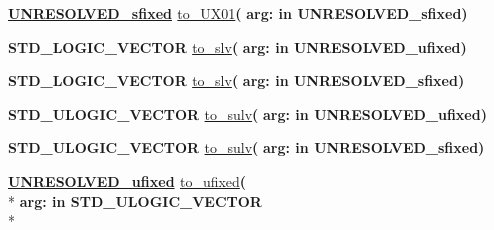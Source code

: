 \begin{DoxyCompactItemize}
\item 
{\bfseries {\bfseries {\bfseries \hyperlink{classfixed__pkg_aa723b28a027c3c0f9bca02d75e8df4d6}{U\+N\+R\+E\+S\+O\+L\+V\+E\+D\+\_\+sfixed}} \textcolor{vhdlchar}{ }}} \hyperlink{classfixed__pkg_a334f0e406ea4f02f81890e38376e20a1}{to\+\_\+\+U\+X01}{\bfseries  ( }{\bfseries \textcolor{vhdlchar}{arg\+: }\textcolor{stringliteral}{in }\textcolor{vhdlchar}{U\+N\+R\+E\+S\+O\+L\+V\+E\+D\+\_\+sfixed}}{\bfseries  )} 
\item 
{\bfseries {\bfseries \textcolor{comment}{S\+T\+D\+\_\+\+L\+O\+G\+I\+C\+\_\+\+V\+E\+C\+T\+O\+R}\textcolor{vhdlchar}{ }}} \hyperlink{classfixed__pkg_a9c3180a00dbf88210834703d4f0e4a18}{to\+\_\+slv}{\bfseries  ( }{\bfseries \textcolor{vhdlchar}{arg\+: }\textcolor{stringliteral}{in }\textcolor{vhdlchar}{U\+N\+R\+E\+S\+O\+L\+V\+E\+D\+\_\+ufixed}}{\bfseries  )} 
\item 
{\bfseries {\bfseries \textcolor{comment}{S\+T\+D\+\_\+\+L\+O\+G\+I\+C\+\_\+\+V\+E\+C\+T\+O\+R}\textcolor{vhdlchar}{ }}} \hyperlink{classfixed__pkg_a9c3180a00dbf88210834703d4f0e4a18}{to\+\_\+slv}{\bfseries  ( }{\bfseries \textcolor{vhdlchar}{arg\+: }\textcolor{stringliteral}{in }\textcolor{vhdlchar}{U\+N\+R\+E\+S\+O\+L\+V\+E\+D\+\_\+sfixed}}{\bfseries  )} 
\item 
{\bfseries {\bfseries \textcolor{comment}{S\+T\+D\+\_\+\+U\+L\+O\+G\+I\+C\+\_\+\+V\+E\+C\+T\+O\+R}\textcolor{vhdlchar}{ }}} \hyperlink{classfixed__pkg_ae65ded74d90d1447219aadde498413f6}{to\+\_\+sulv}{\bfseries  ( }{\bfseries \textcolor{vhdlchar}{arg\+: }\textcolor{stringliteral}{in }\textcolor{vhdlchar}{U\+N\+R\+E\+S\+O\+L\+V\+E\+D\+\_\+ufixed}}{\bfseries  )} 
\item 
{\bfseries {\bfseries \textcolor{comment}{S\+T\+D\+\_\+\+U\+L\+O\+G\+I\+C\+\_\+\+V\+E\+C\+T\+O\+R}\textcolor{vhdlchar}{ }}} \hyperlink{classfixed__pkg_ae65ded74d90d1447219aadde498413f6}{to\+\_\+sulv}{\bfseries  ( }{\bfseries \textcolor{vhdlchar}{arg\+: }\textcolor{stringliteral}{in }\textcolor{vhdlchar}{U\+N\+R\+E\+S\+O\+L\+V\+E\+D\+\_\+sfixed}}{\bfseries  )} 
\item 
{\bfseries {\bfseries {\bfseries \hyperlink{classfixed__pkg_ae78bc2b36d22f6abeac163955e8a587d}{U\+N\+R\+E\+S\+O\+L\+V\+E\+D\+\_\+ufixed}} \textcolor{vhdlchar}{ }}} \hyperlink{classfixed__pkg_ae9cf50571e74e38ef01f8a47789c29fc}{to\+\_\+ufixed}{\bfseries  ( }\\*
{\bfseries \textcolor{vhdlchar}{arg\+: }\textcolor{stringliteral}{in }{\bfseries \textcolor{comment}{S\+T\+D\+\_\+\+U\+L\+O\+G\+I\+C\+\_\+\+V\+E\+C\+T\+O\+R}\textcolor{vhdlchar}{ }}}\\*

\end{DoxyCompactItemize}
